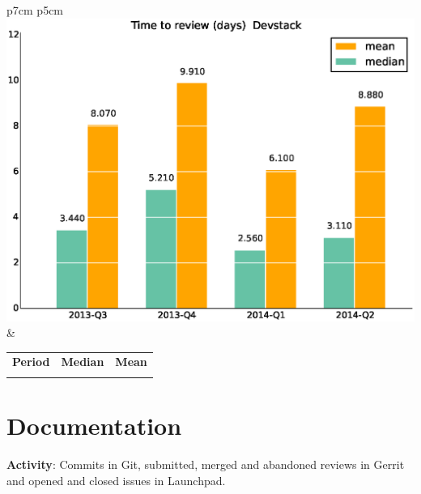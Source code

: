 \documentclass[a4wide,11pt]{report}
\begin{document}
\begin{tabular}{p{7cm} p{5cm}}
    \vspace{0pt} 
    \includegraphics[scale=.35]{figs/timetoreview_medianDevstack.eps}
    & 
    \vspace{0pt}
    \begin{tabular}{l|r|r|}%
    \bfseries Period & \bfseries Median & \bfseries Mean %
    \csvreader[head to column names]{data/timetoreview_medianDevstack.csv}{}%
    {\\ & \mediantime & \meantime}
    \end{tabular}
\end{tabular}

\newpage
\section{Documentation}

\textbf{Activity}: Commits in Git, submitted, merged and abandoned reviews in Gerrit and opened and closed issues in Launchpad.
\end{document}
